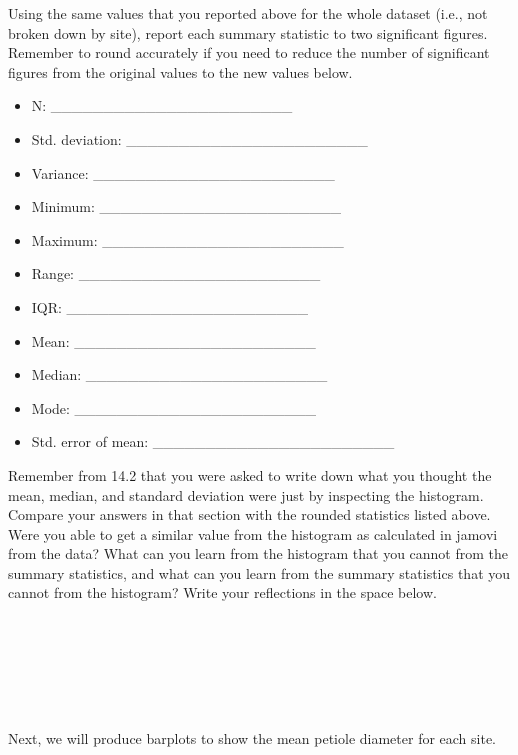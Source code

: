 \documentclass[
  openany]{krantz}
\providecommand{\tightlist}{%
  \setlength{\itemsep}{0pt}\setlength{\parskip}{0pt}}
\begin{document}
Using the same values that you reported above for the whole dataset (i.e., not broken down by site), report each summary statistic to two significant figures.
Remember to round accurately if you need to reduce the number of significant figures from the original values to the new values below.

\begin{itemize}
\tightlist
\item
  N: \_\_\_\_\_\_\_\_\_\_\_\_\_\_\_\_\_\_\_\_\_\_\_
\item
  Std. deviation: \_\_\_\_\_\_\_\_\_\_\_\_\_\_\_\_\_\_\_\_\_\_\_
\item
  Variance: \_\_\_\_\_\_\_\_\_\_\_\_\_\_\_\_\_\_\_\_\_\_\_
\item
  Minimum: \_\_\_\_\_\_\_\_\_\_\_\_\_\_\_\_\_\_\_\_\_\_\_
\item
  Maximum: \_\_\_\_\_\_\_\_\_\_\_\_\_\_\_\_\_\_\_\_\_\_\_
\item
  Range: \_\_\_\_\_\_\_\_\_\_\_\_\_\_\_\_\_\_\_\_\_\_\_
\item
  IQR: \_\_\_\_\_\_\_\_\_\_\_\_\_\_\_\_\_\_\_\_\_\_\_
\item
  Mean: \_\_\_\_\_\_\_\_\_\_\_\_\_\_\_\_\_\_\_\_\_\_\_
\item
  Median: \_\_\_\_\_\_\_\_\_\_\_\_\_\_\_\_\_\_\_\_\_\_\_
\item
  Mode: \_\_\_\_\_\_\_\_\_\_\_\_\_\_\_\_\_\_\_\_\_\_\_
\item
  Std. error of mean: \_\_\_\_\_\_\_\_\_\_\_\_\_\_\_\_\_\_\_\_\_\_\_
\end{itemize}

Remember from 14.2 that you were asked to write down what you thought the mean, median, and standard deviation were just by inspecting the histogram.
Compare your answers in that section with the rounded statistics listed above.
Were you able to get a similar value from the histogram as calculated in jamovi from the data?
What can you learn from the histogram that you cannot from the summary statistics, and what can you learn from the summary statistics that you cannot from the histogram?
Write your reflections in the space below.

\begin{verbatim}






\end{verbatim}

Next, we will produce barplots to show the mean petiole diameter for each site.
\end{document}
